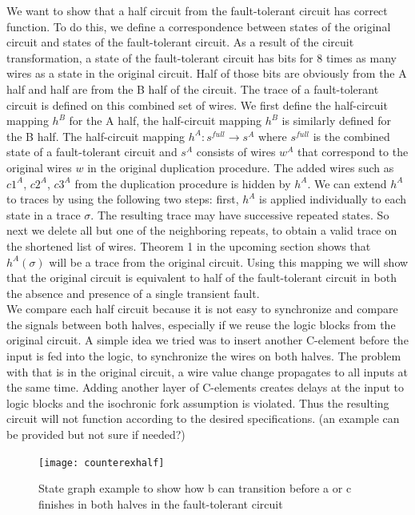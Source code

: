 \documentclass[12pt]{report}
\begin{document}
We want to show that a half circuit from the fault-tolerant circuit has correct function.  To do this, we define a correspondence between states of the original circuit and states of the fault-tolerant circuit.  As a result of the circuit transformation, a state of the fault-tolerant circuit has bits for 8 times as many wires as a state in the original circuit.  Half of those bits are obviously from the A half and half are from the B half of the circuit.  The trace of a fault-tolerant circuit is defined on this combined set of wires.  We first  define the half-circuit mapping $h^B$ for the A half, the half-circuit mapping $h^B$ is similarly defined for the B half.  The half-circuit mapping $h^A: s^{\textit{full}} \to s^A$ where $s^{\textit{full}}$ is the combined state of a fault-tolerant circuit and $s^A$ consists of wires $w^A$ that correspond to the original wires $w$ in the original duplication procedure.  The added wires such as $c1^A$, $c2^A$, $c3^A$ from the duplication procedure is hidden by $h^A$.  We can extend $h^A$ to traces by using the following two steps: first, $h^A$ is applied individually to each state in a trace $\sigma$.  %
The resulting trace may have successive repeated states.  So next we delete all but one of the neighboring repeats, to obtain a valid trace on the shortened list of wires.  Theorem 1 in the upcoming section shows that $h^A(\sigma)$ will be a trace from the original circuit.  
Using this mapping we will show that the original circuit is equivalent to half of the fault-tolerant circuit in both the absence and presence of a single transient fault.
\\

We compare each half circuit because it is not easy to synchronize and compare the signals between both halves, especially if we reuse the logic blocks from the original circuit.  A simple idea we tried was to insert another C-element before the input is fed into the logic, to synchronize the wires on both halves.  The problem with that is in the original circuit, a wire value change propagates to all inputs at the same time.  Adding another layer of C-elements creates delays at the input to logic blocks and the isochronic fork assumption is violated.  Thus the resulting circuit will not function according to the desired specifications.  (an example can be provided but not sure if needed?)\\  
\begin{figure}
  \centering
    \texttt{[image: counterexhalf]}
  \caption{State graph example to show how b can transition before a or c finishes in both halves in the fault-tolerant circuit}
  \label{fig:counterexhalf}
\end{figure}
\end{document}
